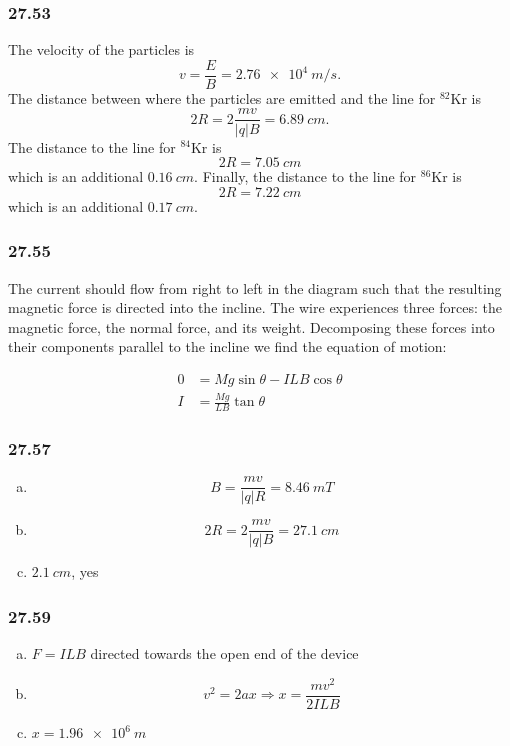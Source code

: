 \documentclass{article}
\begin{document}
\subsubsection{27.53}

The velocity of the particles is \[v = \frac{E}{B} = \qty{2.76e4}{m/s}.\] The distance between where the particles are emitted and the line for $^{82}$Kr is \[2 R = 2 \frac{m v}{|q| B} = \qty{6.89}{cm}.\] The distance to the line for $^{84}$Kr is \[2 R = \qty{7.05}{cm}\] which is an additional $\qty{0.16}{cm}$. Finally, the distance to the line for $^{86}$Kr is \[2 R = \qty{7.22}{cm}\] which is an additional $\qty{0.17}{cm}$.

\subsubsection{27.55}

The current should flow from right to left in the diagram such that the resulting magnetic force is directed into the incline. The wire experiences three forces: the magnetic force, the normal force, and its weight. Decomposing these forces into their components parallel to the incline we find the equation of motion:

\begin{align*}
  0 & = M g \sin \theta - I L B \cos \theta \\
  I & = \frac{M g}{L B} \tan \theta
\end{align*}

\subsubsection{27.57}

\begin{enumerate}[(a)]
  \item \[B = \frac{m v}{|q| R} = \qty{8.46}{mT}\]

  \item \[2 R = 2 \frac{m v}{|q| B} = \qty{27.1}{cm}\]

  \item $\qty{2.1}{cm}$, yes
\end{enumerate}

\subsubsection{27.59}

\begin{enumerate}[(a)]
  \item $F = I L B$ directed towards the open end of the device

  \item \[v^2 = 2 a x \Rightarrow x = \frac{m v^2}{2 I L B}\]

  \item $x = \qty{1.96e6}{m}$
\end{enumerate}
\end{document}
